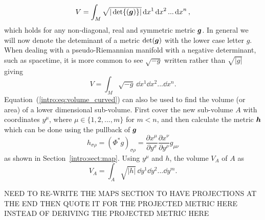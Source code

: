 \begin{equation}
V = \int_{M} \sqrt{|\det{({\boldsymbol{g}})}|} \dd {x}^1 \dd {x}^2 ... \dd {x}^n,
\end{equation}
which holds for any non-diagonal, real and symmetric metric $\boldsymbol{g}$. In general we will now denote the deteminant of a metric $\det(\boldsymbol{g})$ with the lower case letter $g$. When dealing with a pseudo-Riemannian manifold with a negative determinant, such as spacetime, it is more common to see $\sqrt{-g}$ written rather than $\sqrt{|g|}$ giving
\begin{equation}
V = \int_{M}\sqrt{-g} \,\dd {x}^1 \dd {x}^2 ... \dd {x}^n.
\end{equation}
Equation~(\ref{intro:eq:volume_curved}) can also be used to find the volume (or area) of a lower dimensional sub-volume. First cover the new sub-volume $A$ with coordinates $y^\mu$, where $\mu\in\{1,2,...,m\}$ for $m<n$, and then calculate the metric $\boldsymbol{h}$ which can be done using the pullback of $\boldsymbol{g}$
\begin{equation}
h_{\sigma\rho} = (\Phi^* g)_{\sigma\rho}= \frac{\partial x^\mu}{\partial y^\sigma} \frac{\partial x^\nu}{\partial y^\rho} g_{\mu\nu}
\end{equation}
as shown in Section~\ref{intro:sect:map}. Using $y^\mu$ and $h$, the volume $V_A$ of $A$ as 
\begin{equation} \label{intro:eq:area_int}
V_A = \int_{A}\sqrt{|h|} \,\dd {y}^1 \dd {y}^2 ... \dd {y}^m.
\end{equation}

NEED TO RE-WRITE THE MAPS SECTION TO HAVE PROJECTIONS AT THE END THEN QUOTE IT FOR THE PROJECTED METRIC HERE INSTEAD OF DERIVING THE PROJECTED METRIC HERE

